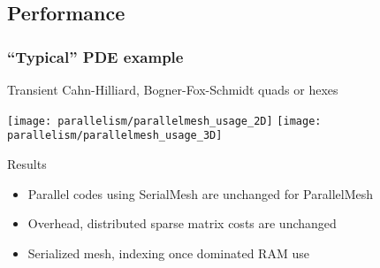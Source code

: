 
\subsection{Performance}

\begin{frame}
\frametitle{``Typical'' PDE example}

Transient Cahn-Hilliard, Bogner-Fox-Schmidt quads or hexes

  \texttt{[image: parallelism/parallelmesh\_usage\_2D]}
  \texttt{[image: parallelism/parallelmesh\_usage\_3D]}

\begin{block}{Results}
\begin{itemize}
\item Parallel codes using SerialMesh are unchanged for ParallelMesh
\item Overhead, distributed sparse matrix costs are unchanged
\item Serialized mesh, indexing once dominated RAM use
\end{itemize}
\end{block}
\end{frame}
